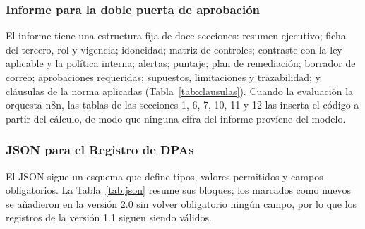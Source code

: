 \documentclass[12pt,letterpaper]{article}
\begin{document}
\subsubsection{Informe para la doble puerta de aprobación}

El informe tiene una estructura fija de doce secciones: resumen ejecutivo; ficha del tercero, rol y vigencia; idoneidad; matriz de controles; contraste con la ley aplicable y la política interna; alertas; puntaje; plan de remediación; borrador de correo; aprobaciones requeridas; supuestos, limitaciones y trazabilidad; y cláusulas de la norma aplicadas (Tabla~\ref{tab:clausulas}). Cuando la evaluación la orquesta n8n, las tablas de las secciones 1, 6, 7, 10, 11 y 12 las inserta el código a partir del cálculo, de modo que ninguna cifra del informe proviene del modelo.

\subsubsection{JSON para el Registro de DPAs}

El JSON sigue un esquema que define tipos, valores permitidos y campos obligatorios. La Tabla~\ref{tab:json} resume sus bloques; los marcados como nuevos se añadieron en la versión 2.0 sin volver obligatorio ningún campo, por lo que los registros de la versión 1.1 siguen siendo válidos.
\end{document}
